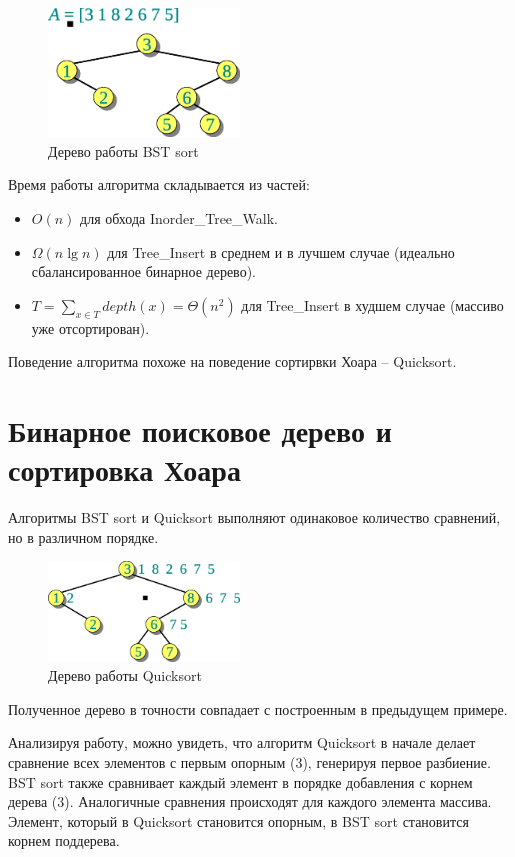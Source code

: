 \documentclass[11pt]{article}
\begin{document}
\begin{figure}[ht]
  \centering
  \includegraphics[width=2in]{lecture10/bs_tree.eps}
  \caption{Дерево работы BST sort}
  \label{fig:bs_tree}
\end{figure}

Время работы алгоритма складывается из частей:
\begin{itemize}
\item $O(n)$ для обхода Inorder\_Tree\_Walk.
\item $\Omega(n \lg n)$ для Tree\_Insert в среднем и в лучшем случае (идеально
  сбалансированное бинарное дерево).
\item $T = \sum_{x \in T} depth(x) = \Theta(n^2)$ для Tree\_Insert в худшем
  случае (массиво уже отсортирован).
\end{itemize}

Поведение алгоритма похоже на поведение сортирвки Хоара -- Quicksort.

\section{Бинарное поисковое дерево и сортировка Хоара}
Алгоритмы BST sort и Quicksort выполняют одинаковое количество сравнений, но в
различном порядке.
\begin{figure}[ht]
  \centering
  \includegraphics[width=2in]{lecture10/qs_tree.eps}
  \caption{Дерево работы Quicksort}
  \label{fig:qs_tree}
\end{figure}

Полученное дерево в точности совпадает с построенным в предыдущем примере.

Анализируя работу, можно увидеть, что алгоритм Quicksort в начале делает
сравнение всех элементов с первым опорным (3), генерируя первое разбиение.
BST sort также сравнивает каждый элемент в порядке добавления с корнем дерева
(3). Аналогичные сравнения происходят для каждого элемента массива.
Элемент, который в Quicksort становится опорным, в BST sort становится корнем
поддерева.
\end{document}
